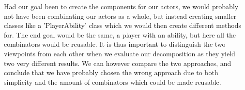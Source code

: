 Had our goal been to create the components for our actors, we would probably not have been combinating our actors as a whole, but instead creating smaller classes like a 'PlayerAbility' class which we would then create different methods for. The end goal would be the same, a player with an ability, but here all the combinators would be reusable. It is thus important to distinguish the two viewpoints from each other when we evaluate our decomposition as they yield two very different results. We can however compare the two approaches, and conclude that we have probably chosen the wrong approach due to both simplicity and the amount of combinators which could be made reusable. 
